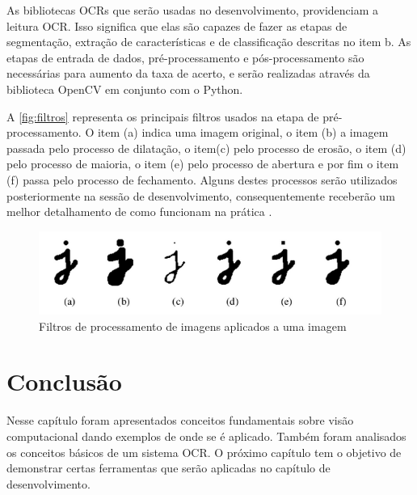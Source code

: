 As bibliotecas OCRs que serão usadas no desenvolvimento, providenciam a leitura OCR. Isso significa que elas são capazes de fazer as etapas de segmentação, extração de características e de classificação descritas no item b. As etapas de entrada de dados, pré-processamento e pós-processamento são necessárias para aumento da taxa de acerto, e serão realizadas através da biblioteca OpenCV em conjunto com o Python.

A \autoref{fig:filtros} representa os principais filtros usados na etapa de pré-processamento. O item (a) indica uma imagem original, o item (b) a imagem passada pelo processo de dilatação, o item(c) pelo processo de erosão, o item (d) pelo processo de maioria, o item (e) pelo processo de abertura e por fim o item (f) passa pelo processo de fechamento. Alguns destes processos serão utilizados posteriormente na sessão de desenvolvimento, consequentemente receberão um melhor detalhamento de como funcionam na prática \cite{caap}.

\begin{figure}[htbp]
\caption{\label{fig:filtros}Filtros de processamento de imagens aplicados a uma imagem}
\begin{center}
\includegraphics[width=.9\textwidth]{figuras/f4c2.png}
\end{center}
\end{figure}

\section{Conclusão}

Nesse capítulo foram apresentados conceitos fundamentais sobre visão computacional dando exemplos de onde se é aplicado. Também foram analisados os conceitos básicos de um sistema OCR. O próximo capítulo tem o objetivo de demonstrar certas ferramentas que serão aplicadas no capítulo de desenvolvimento.
